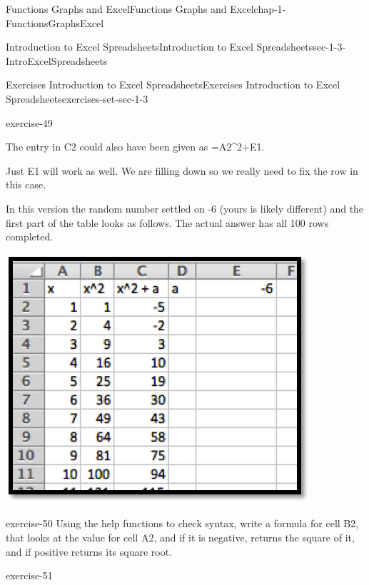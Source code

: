 \documentclass[oneside,10pt,]{book}
\numberwithin{equation}{section}
\begin{document}
\begin{chapterptx}{Functions Graphs and Excel}{}{Functions Graphs and Excel}{}{}{chap-1-FunctionsGraphsExcel}
\begin{sectionptx}{Introduction to Excel Spreadsheets}{}{Introduction to Excel Spreadsheets}{}{}{sec-1-3-IntroExcelSpreadsheets}
\begin{exercises-subsection-numberless}{Exercises Introduction to Excel Spreadsheets}{}{Exercises Introduction to Excel Spreadsheets}{}{}{exercises-set-sec-1-3}
\begin{divisionexercise}{7}{}{}{exercise-49}
\begin{sidebyside}{1}{0.1}{0.1}{0}
\begin{sbspanel}{0.8}
\end{sbspanel}%
\end{sidebyside}%
%
\par
\hypertarget{p-300}{}%
The entry in C2 could also have been given as =A2\textasciicircum{}2+\textdollar{}E\textdollar{}1.%
\par
\hypertarget{p-301}{}%
Just E\textdollar{}1 will work as well. We are filling down so we really need to fix the row in this case.%
\par
\hypertarget{p-302}{}%
In this version the random number settled on -6 (yours is likely different) and the first part of the table looks as follows. The actual answer has all 100 rows completed. \leavevmode%
\begin{sidebyside}{1}{0.1}{0.1}{0}%
\begin{sbspanel}{0.8}%
\includegraphics[width=1\linewidth]{images/sec1-3-sol7b.png}
\end{sbspanel}%
\end{sidebyside}%
%
\end{divisionexercise}%
\begin{divisionexercise}{8}{}{}{exercise-50}%
\hypertarget{p-303}{}%
Using the help functions to check syntax, write a formula for cell B2, that looks at the value for cell A2, and if it is negative, returns the square of it, and if positive returns its square root.%
\end{divisionexercise}%
\begin{divisionexercise}{9}{}{}{exercise-51}%
\hypertarget{p-304}{}%

\end{divisionexercise}
\end{exercises-subsection-numberless}
\end{sectionptx}
\end{chapterptx}
\end{document}

